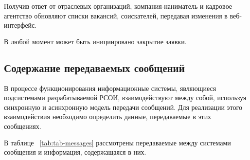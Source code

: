 Получив ответ от отраслевых организаций, компания-наниматель и кадровое агентство обновляют списки вакансий, соискателей, передавая изменения в веб-интерфейс.

В любой момент может быть инициировано закрытие заявки.


\subsection{Содержание передаваемых сообщений}
В процессе функционирования информационные системы, являющиеся подсистемами разрабатываемой РСОИ, взаимодействуют между собой, используя синхронную и асинхронную модель передачи сообщений. Для реализации этого взаимодействия необходимо определить данные, передаваемые в этих сообщениях.

В таблице ~\ref{tab:tab-messages} рассмотрены передаваемые между системами сообщения и информация, содержащаяся в них.
